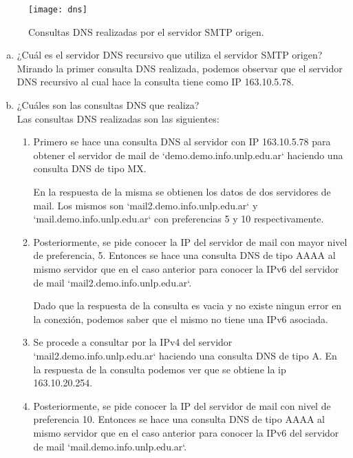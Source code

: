 \documentclass[osajnl,twocolumn,showpacs,superscriptaddress,10pt]{revtex4-1} %
\begin{document}
\begin{figure}[H]
    \centering
    \texttt{[image: dns]}
    \caption{Consultas DNS realizadas por el servidor SMTP origen.}
\end{figure}

\begin{enumerate}[a)]
  \item ¿Cuál es el servidor DNS recursivo que utiliza el servidor SMTP origen? \\

  Mirando la primer consulta DNS realizada, podemos observar que el servidor DNS recursivo al cual hace la consulta tiene como IP 163.10.5.78. \\

  \item ¿Cuáles son las consultas DNS que realiza? \\

  Las consultas DNS realizadas son las siguientes:

  \begin{enumerate}[1.]
    \item Primero se hace una consulta DNS al servidor con IP 163.10.5.78 para obtener el servidor de mail de `demo.demo.info.unlp.edu.ar` haciendo una consulta DNS de tipo MX.

    En la respuesta de la misma se obtienen los datos de dos servidores de mail. Los mismos son `mail2.demo.info.unlp.edu.ar` y `mail.demo.info.unlp.edu.ar` con preferencias 5 y 10 respectivamente. \\

    \item Posteriormente, se pide conocer la IP del servidor de mail con mayor nivel de preferencia, 5. Entonces se hace una consulta DNS de tipo AAAA al mismo servidor que en el caso anterior para conocer la IPv6 del servidor de mail `mail2.demo.info.unlp.edu.ar`.

    Dado que la respuesta de la consulta es vacia y no existe ningun error en la conexión, podemos saber que el mismo no tiene una IPv6 asociada. \\

    \item Se procede a consultar por la IPv4 del servidor `mail2.demo.info.unlp.edu.ar` haciendo una consulta DNS de tipo A. En la respuesta de la consulta podemos ver que se obtiene la ip 163.10.20.254. \\

    \item Posteriormente, se pide conocer la IP del servidor de mail con nivel de preferencia 10. Entonces se hace una consulta DNS de tipo AAAA al mismo servidor que en el caso anterior para conocer la IPv6 del servidor de mail `mail.demo.info.unlp.edu.ar`.


\end{enumerate}
\end{enumerate}
\end{document}
